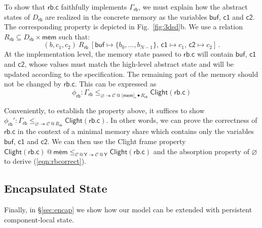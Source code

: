 \documentclass[acmsmall,screen,review,anonymous]{acmart}
\newcommand{\kw}[1]{\ensuremath{ \mathsf{#1} }}
\newcommand{\jr}{\mathsf{Y}}
\begin{document}

\begin{example} %
To show that $\kw{rb.c}$
faithfully implements $\Gamma_\kw{rb}$,
we must explain how the abstract states of $D_\kw{rb}$
are realized in the concrete memory
as the variables $\kw{buf}$, $\kw{c1}$ and $\kw{c2}$.
The corresponding property is depicted in Fig.~\ref{fig:3dsd}b.
We
use a relation $R_\kw{rb} \subseteq D_\kw{rb} \times \kw{mem}$
such that:
\[
  (b, c_1, c_2) \: \mathrel{R_\kw{rb}} \:
  [\kw{buf} \mapsto \{b_0, \ldots, b_{N-1}\}, \,
   \kw{c1} \mapsto c_1, \,
   \kw{c2} \mapsto c_2]
  \,.
\]
At the implementation level,
the memory state passed to $\kw{rb.c}$
will contain $\kw{buf}$, $\kw{c1}$ and $\kw{c2}$,
whose values must match the high-level abstract state
and will be updated according to the specification.
The remaining part of the memory should not be changed by $\kw{rb.c}$.
This can be expressed as
\begin{equation} \label{eqn:rbcorrect}
  \phi_\kw{rb} :
  \Gamma_\kw{rb}
  \le_{\varnothing \twoheadrightarrow
       \mathcal{C} \mathbin@
       \langle \kw{mem} ]_* \bullet R_\kw{rb}}
  \kw{Clight}(\kw{rb.c})
\end{equation}

Conveniently,
to establish the property above,
it suffices to show
$\phi_\kw{rb}' :
  \Gamma_\kw{rb}
  \le_{\varnothing \twoheadrightarrow \mathcal{C} \mathbin@ R_\kw{rb}}
  \kw{Clight}(\kw{rb.c})
$.
In other words,
we can prove the correctness of $\kw{rb.c}$
in the context of a minimal memory share
which contains only the variables $\kw{buf}$, $\kw{c1}$ and $\kw{c2}$.
We can then use the Clight frame property
$\kw{Clight}(\kw{rb.c}) \mathbin@ \kw{mem}
 \le_{\mathcal{C} \mathbin@ \jr \twoheadrightarrow
      \mathcal{C} \mathbin@ \jr}
 \kw{Clight}(\kw{rb.c})$
and the absorption property of $\varnothing$
to derive (\ref{eqn:rbcorrect}).
\end{example}

\subsection{Encapsulated State} \label{sec:overview:encap} %

Finally,
in \S\ref{sec:encap}
we show how our model can be extended
with persistent component-local state.
\end{document}
